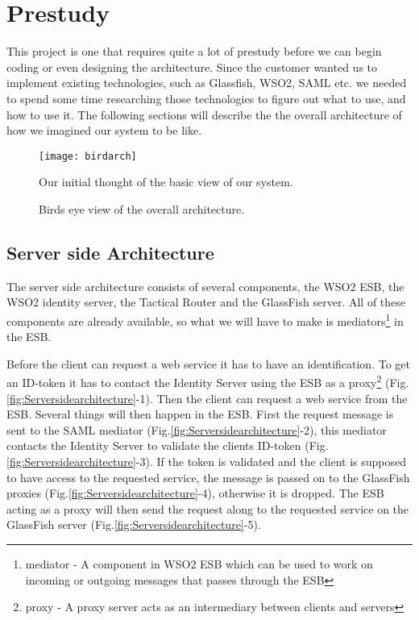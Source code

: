 \section{Prestudy}\label{Prestudy} This project is one that requires quite a lot of prestudy before we can begin coding or even designing the architecture. Since the customer wanted us to implement existing technologies, such as Glassfish, WSO2, SAML etc. we needed to spend some time researching those technologies to figure out what to use, and how to use it. The following sections will describe the the overall architecture of how we imagined our system to be like. 

        \begin{figure}[htb]
            \centering
            \texttt{[image: birdarch]}
            \caption{Birds eye view of the overall architecture.}
            Our initial thought of the basic view of our system. 
            \label{fig:birdarch}
        \end{figure}

    \subsection{Server side Architecture}\label{Server side Architecture}
    
        The server side architecture consists of several components, the WSO2 ESB, the WSO2 \gls{identity server}, the Tactical Router and the GlassFish server. All of these components are already available, so what we will have to make is \glspl{mediator}\footnote{\Gls{mediator} - A component in WSO2 ESB which can be used to work on incoming or outgoing messages that passes through the ESB} in the ESB.

        Before the client can request a web service it has to have an identification. To get an ID-\gls{token} it has to contact the Identity Server using the ESB as a \gls{proxy}\footnote{\Gls{proxy} - A proxy server acts as an intermediary between clients and servers} (Fig.\ref{fig:Serversidearchitecture}-1). Then the client can request a web service from the ESB. Several things will then happen in the ESB. First the request message is sent to the SAML mediator (Fig.\ref{fig:Serversidearchitecture}-2), this mediator contacts the Identity Server to validate the clients ID-token (Fig.\ref{fig:Serversidearchitecture}-3). If the token is validated and the client is supposed to have access to the requested service, the message is passed on to the GlassFish proxies (Fig.\ref{fig:Serversidearchitecture}-4), otherwise it is dropped. The ESB acting as a proxy will then send the request along to the requested service on the GlassFish server (Fig.\ref{fig:Serversidearchitecture}-5).

